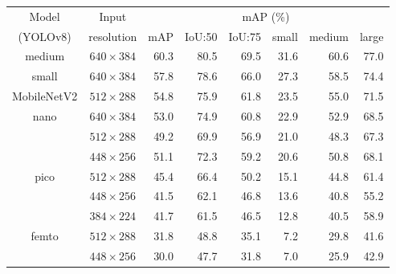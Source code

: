 \begin{table}[t]
    \centering
    \small
    \begin{threeparttable}
        \begin{tabular}{|c|c|rrrrrr|}
            \hline
            Model & Input & \multicolumn{6}{c|}{mAP (\%)} \\
            \cline{3-8}
            (YOLOv8)                     & resolution                       & mAP & IoU:50& IoU:75& small & medium& large \\
            \hline
            \hline
            \multirow{1}{*}{medium}      & \multirow{1}{*}{$640\times384$}  & 60.3 & 80.5 & 69.5 & 31.6 & 60.6 & 77.0 \\
            \hline                                                          
            \multirow{1}{*}{small}       & \multirow{1}{*}{$640\times384$}  & 57.8 & 78.6 & 66.0 & 27.3 & 58.5 & 74.4 \\
            \hline
            \multirow{1}{*}{MobileNetV2} & \multirow{1}{*}{$512\times288$}  & 54.8 & 75.9 & 61.8 & 23.5 & 55.0 & 71.5 \\
            \hline                      
            \multirow{3}{*}{nano}        & \multirow{1}{*}{$640\times384$}  & 53.0 & 74.9 & 60.8 & 22.9 & 52.9 & 68.5 \\
            \cline{2-2}
                                        & \multirow{1}{*}{$512\times288$}  & 49.2 & 69.9 & 56.9 & 21.0 & 48.3 & 67.3 \\
            \cline{2-2}
                                        & \multirow{1}{*}{$448\times256$}  & 51.1 & 72.3 & 59.2 & 20.6 & 50.8 & 68.1 \\
            \hline
            \multirow{3}{*}{pico}        & \multirow{1}{*}{$512\times288$}  & 45.4 & 66.4 & 50.2 & 15.1 & 44.8 & 61.4 \\
            \cline{2-2}
                                        & \multirow{1}{*}{$448\times256$}  & 41.5 & 62.1 & 46.8 & 13.6 & 40.8 & 55.2 \\
            \cline{2-2}
                                        & \multirow{1}{*}{$384\times224$}  & 41.7 & 61.5 & 46.5 & 12.8 & 40.5 & 58.9 \\
            \hline
            \multirow{4}{*}{femto}       & \multirow{1}{*}{$512\times288$}  & 31.8 & 48.8 & 35.1 &  7.2 & 29.8 & 41.6 \\
            \cline{2-2}
                                        & \multirow{1}{*}{$448\times256$}  & 30.0 & 47.7 & 31.8 &  7.0 & 25.9 & 42.9 \\

\end{tabular}
\end{threeparttable}
\end{table}
